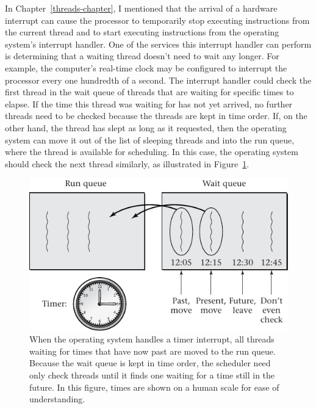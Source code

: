 In Chapter~\ref{threads-chapter}, I mentioned that the arrival of a hardware
interrupt can cause the processor to temporarily stop executing
instructions from the current thread and to start executing instructions
from the operating system's interrupt handler.  One of the services this
interrupt handler can perform is determining that a waiting thread doesn't
need to wait any longer.  For example, the computer's real-time clock
may be configured to interrupt the processor every one hundredth of a
second.  The interrupt handler could check the first thread in the
wait queue of threads that are waiting for specific times to elapse.  If the time
this thread was waiting for has not yet arrived, no further threads
need to be checked because the threads are kept in time order.  If,
on the other hand, the thread has slept as long as it requested, then
the operating system can move it out of the list of sleeping threads
and into the run queue, where the thread is available for scheduling.  In
this case, the operating system should check the next thread
similarly, as illustrated in Figure~\ref{scan-3-5}.
\begin{figure}
\centerline{\includegraphics{hail_f0302}}
\caption{When the operating system handles a timer interrupt, all
  threads waiting for times that have now past are moved to the run
  queue. Because the wait queue is kept in time order, the scheduler
  need only check threads until it finds one waiting for a time still
  in the future. In this figure, times are shown on a human scale for
  ease of understanding.}
\label{scan-3-5}
\end{figure}

